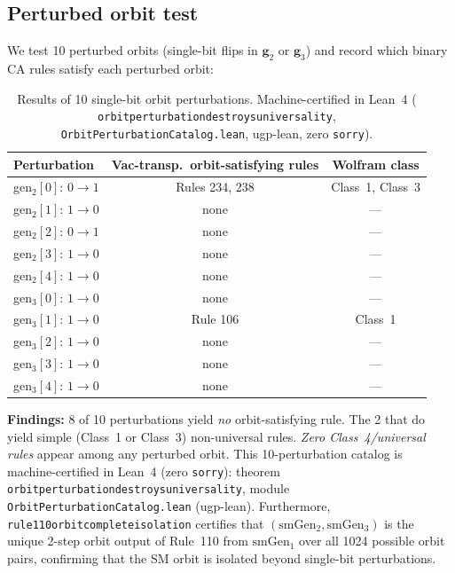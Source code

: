 \documentclass[11pt]{article}
\theoremstyle{remark}
\newcommand{\lean}[1]{%
  \penalty-100
  \begingroup\def\_{\textunderscore\allowbreak}\texttt{#1}\endgroup}
\begin{document}
\subsection{Perturbed orbit test}

We test 10 perturbed orbits (single-bit flips in $\mathbf{g}_2$ or $\mathbf{g}_3$)
and record which binary CA rules satisfy each perturbed orbit:

\begin{table}[H]
\centering
\caption{Results of 10 single-bit orbit perturbations. Machine-certified in Lean~4
  (\lean{orbit\_perturbation\_destroys\_universality}, \lean{Orbit\-Perturbation\-Catalog.lean},
  ugp-lean, zero \texttt{sorry}).}
\label{tab:perturbed}
\small
\renewcommand{\arraystretch}{1.2}
\begin{tabular}{@{}lcc@{}}
\toprule
\textbf{Perturbation} & \textbf{Vac-transp.\ orbit-satisfying rules} & \textbf{Wolfram class}\\
\midrule
gen$_2[0]$: $0\to1$ & Rules 234, 238 & Class~1, Class~3\\
gen$_2[1]$: $1\to0$ & none & ---\\
gen$_2[2]$: $0\to1$ & none & ---\\
gen$_2[3]$: $1\to0$ & none & ---\\
gen$_2[4]$: $1\to0$ & none & ---\\
gen$_3[0]$: $1\to0$ & none & ---\\
gen$_3[1]$: $1\to0$ & Rule 106 & Class~1\\
gen$_3[2]$: $1\to0$ & none & ---\\
gen$_3[3]$: $1\to0$ & none & ---\\
gen$_3[4]$: $1\to0$ & none & ---\\
\bottomrule
\end{tabular}
\end{table}

\textbf{Findings:} 8 of 10 perturbations yield \emph{no} orbit-satisfying rule.
The 2 that do yield simple (Class~1 or Class~3) non-universal rules.
\emph{Zero Class~4/universal rules} appear among any perturbed orbit.
This 10-perturbation catalog is machine-certified in Lean~4 (zero \texttt{sorry}):
theorem \lean{orbit\_perturbation\_destroys\_universality}, module
\lean{Orbit\-Perturbation\-Catalog.lean} (ugp-lean).
Furthermore, \lean{rule110\_orbit\_complete\_isolation} certifies that
$(\mathrm{smGen}_2, \mathrm{smGen}_3)$ is the unique 2-step orbit output of Rule~110
from $\mathrm{smGen}_1$ over all 1024 possible orbit pairs, confirming that
the SM orbit is isolated beyond single-bit perturbations.
\end{document}

